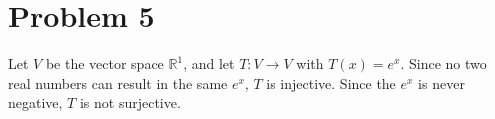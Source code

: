 \section{Problem 5}

Let $V$ be the vector space $\mathbb{R}^1$,  
and let $T: V \rightarrow V$ with $T(x) = e^x$.
Since no two real numbers can result in the same $e^x$,
$T$ is injective.
Since the $e^x$ is never negative,
$T$ is not surjective.

